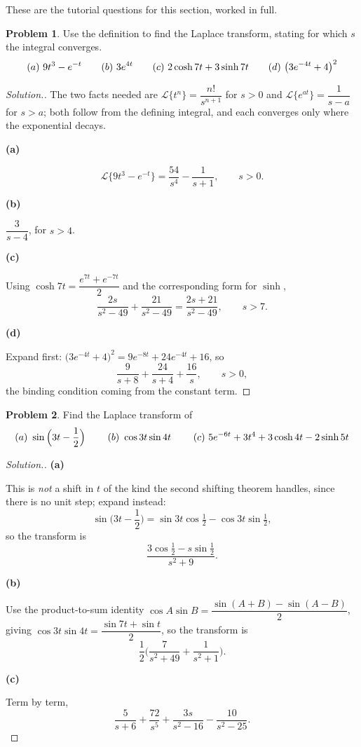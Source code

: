 \documentclass[11pt,a4paper]{article}
\theoremstyle{definition}
\newtheorem{problemx}{Problem}[subsection]
\newenvironment{problem}{\begin{problemx}}{\end{problemx}}
\newenvironment{solution}
  {\renewcommand{\qedsymbol}{}\begin{proof}[\textit{Solution}.]}
  {\end{proof}}
\newcommand{\subhead}[1]{%
  \par\medskip\noindent\textbf{#1}\par\nobreak\smallskip}
\begin{document}
These are the tutorial questions for this section, worked in full.

\begin{problem}
Use the definition to find the Laplace transform, stating for which $s$ the
integral converges.
$$(a)\ 9t^3-e^{-t}\hspace{0.7cm}(b)\ 3e^{4t}\hspace{0.7cm}
(c)\ 2\cosh 7t+3\sinh 7t\hspace{0.7cm}(d)\ \big(3e^{-4t}+4\big)^2$$
\end{problem}
\begin{solution}
The two facts needed are
$\mathcal{L}\{t^n\} = \dfrac{n!}{s^{n+1}}$ for $s>0$ and
$\mathcal{L}\{e^{at}\} = \dfrac{1}{s-a}$ for $s>a$; both follow from the
defining integral, and each converges only where the exponential decays.

\subhead{(a)}
$$\mathcal{L}\big\{9t^3-e^{-t}\big\} = \frac{54}{s^4} - \frac{1}{s+1},
\qquad s>0 .$$

\subhead{(b)}
$\dfrac{3}{s-4}$, for $s>4$.

\subhead{(c)}
Using $\cosh 7t = \dfrac{e^{7t}+e^{-7t}}{2}$ and the corresponding form for
$\sinh$,
$$\frac{2s}{s^2-49} + \frac{21}{s^2-49} = \frac{2s+21}{s^2-49},
\qquad s>7 .$$

\subhead{(d)}
Expand first:
$\big(3e^{-4t}+4\big)^2 = 9e^{-8t}+24e^{-4t}+16$, so
$$\frac{9}{s+8} + \frac{24}{s+4} + \frac{16}{s},\qquad s>0 ,$$
the binding condition coming from the constant term.
\end{solution}

\begin{problem}
Find the Laplace transform of
$$(a)\ \sin\Big(3t-\frac12\Big)\hspace{0.8cm}(b)\ \cos 3t\sin 4t
\hspace{0.8cm}(c)\ 5e^{-6t}+3t^4+3\cosh 4t-2\sinh 5t$$
\end{problem}
\begin{solution}
\subhead{(a)}
This is \emph{not} a shift in $t$ of the kind the second shifting theorem
handles, since there is no unit step; expand instead:
$$\sin\Big(3t-\frac12\Big) = \sin 3t\cos\tfrac12 - \cos 3t\sin\tfrac12 ,$$
so the transform is
$$\frac{3\cos\frac12 - s\sin\frac12}{s^2+9}.$$

\subhead{(b)}
Use the product-to-sum identity
$\cos A\sin B = \dfrac{\sin(A+B)-\sin(A-B)}{2}$, giving
$\cos 3t\sin 4t = \dfrac{\sin 7t+\sin t}{2}$, so the transform is
$$\frac12\Big(\frac{7}{s^2+49} + \frac{1}{s^2+1}\Big).$$

\subhead{(c)}
Term by term,
$$\frac{5}{s+6} + \frac{72}{s^5} + \frac{3s}{s^2-16} - \frac{10}{s^2-25}.$$
\end{solution}
\end{document}
